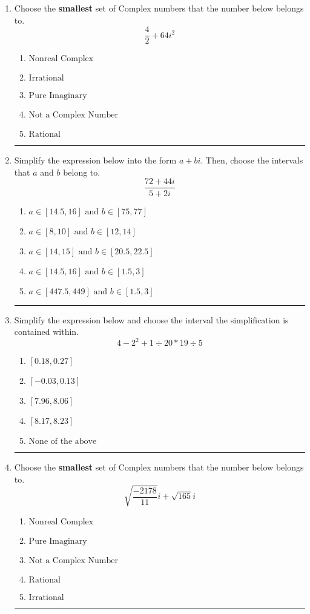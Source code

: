 \documentclass[14pt]{extbook}
\newcommand{\litem}[1]{\item#1\hspace*{-1cm}\rule{\textwidth}{0.4pt}}
\begin{document}
\begin{enumerate}
{\begin{enumerate}[label=\Alph*.]
\end{enumerate} }
\litem{
Choose the \textbf{smallest} set of Complex numbers that the number below belongs to.\[ \frac{4}{2}+64i^2 \]\begin{enumerate}[label=\Alph*.]
\item \( \text{Nonreal Complex} \)
\item \( \text{Irrational} \)
\item \( \text{Pure Imaginary} \)
\item \( \text{Not a Complex Number} \)
\item \( \text{Rational} \)

\end{enumerate} }
\litem{
Simplify the expression below into the form $a+bi$. Then, choose the intervals that $a$ and $b$ belong to.\[ \frac{72 + 44 i}{5 + 2 i} \]\begin{enumerate}[label=\Alph*.]
\item \( a \in [14.5, 16] \text{ and } b \in [75, 77] \)
\item \( a \in [8, 10] \text{ and } b \in [12, 14] \)
\item \( a \in [14, 15] \text{ and } b \in [20.5, 22.5] \)
\item \( a \in [14.5, 16] \text{ and } b \in [1.5, 3] \)
\item \( a \in [447.5, 449] \text{ and } b \in [1.5, 3] \)

\end{enumerate} }
\litem{
Simplify the expression below and choose the interval the simplification is contained within.\[ 4 - 2^2 + 1 \div 20 * 19 \div 5 \]\begin{enumerate}[label=\Alph*.]
\item \( [0.18, 0.27] \)
\item \( [-0.03, 0.13] \)
\item \( [7.96, 8.06] \)
\item \( [8.17, 8.23] \)
\item \( \text{None of the above} \)

\end{enumerate} }
\litem{
Choose the \textbf{smallest} set of Complex numbers that the number below belongs to.\[ \sqrt{\frac{-2178}{11}} i+\sqrt{165}i \]\begin{enumerate}[label=\Alph*.]
\item \( \text{Nonreal Complex} \)
\item \( \text{Pure Imaginary} \)
\item \( \text{Not a Complex Number} \)
\item \( \text{Rational} \)
\item \( \text{Irrational} \)


\end{enumerate}}
\end{enumerate}
\end{document}
